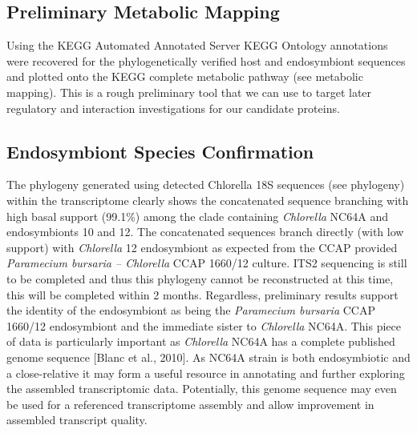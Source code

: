 \subsection{Preliminary Metabolic Mapping}
Using the KEGG Automated Annotated Server KEGG Ontology annotations were recovered for the phylogenetically verified host and endosymbiont sequences and plotted onto the KEGG complete metabolic pathway (see metabolic mapping).  This is a rough preliminary tool that we can use to target later regulatory and interaction investigations for our candidate proteins.

\subsection{Endosymbiont Species Confirmation}

The phylogeny generated using detected Chlorella 18S sequences (see phylogeny) within the transcriptome clearly shows the concatenated sequence branching with high basal support (99.1\%) among the clade containing \textit{Chlorella} NC64A and endosymbionts 10 and 12. 
The concatenated sequences branch directly (with low support) with \textit{Chlorella} 12 endosymbiont as expected from the CCAP provided \textit{Paramecium bursaria – Chlorella} CCAP 1660/12 culture.  
ITS2 sequencing is still to be completed and thus this phylogeny cannot be reconstructed at this time, this will be completed within 2 months.
Regardless, preliminary results support the identity of the endosymbiont as being the \textit{Paramecium bursaria} CCAP 1660/12 endosymbiont and the immediate sister to \textit{Chlorella} NC64A.  This piece of data is particularly important as \textit{Chlorella} NC64A has a complete published genome sequence [Blanc et al., 2010]. As NC64A strain is both endosymbiotic and a close-relative it may form a useful resource in annotating and further exploring the assembled transcriptomic data.  
Potentially, this genome sequence may even be used for a referenced transcriptome assembly and allow improvement in assembled transcript quality.


